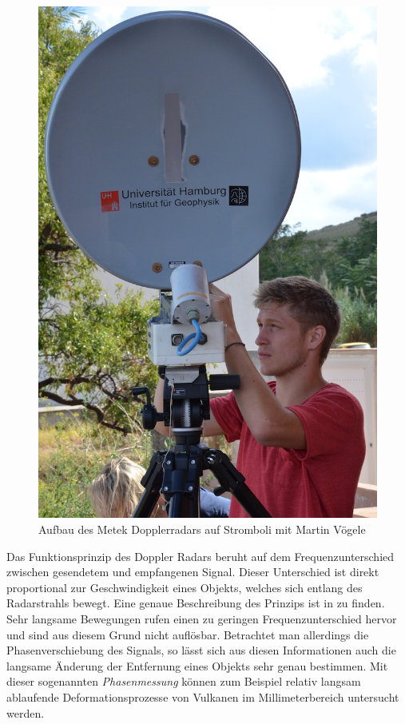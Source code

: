 \documentclass[12pt,a4paper]{scrartcl}
\begin{document}
\begin{figure}[htb]
\centering
\includegraphics[scale=.3]{hardwareimages/radar.jpg}
\caption{Aufbau des Metek Dopplerradars auf Stromboli mit Martin Vögele}
\label{radar}
\end{figure}

Das Funktionsprinzip des Doppler Radars beruht auf dem Frequenzunterschied zwischen gesendetem und empfangenen Signal. Dieser Unterschied ist direkt proportional zur Geschwindigkeit eines Objekts, welches sich entlang des Radarstrahls bewegt. Eine genaue Beschreibung des Prinzips ist in \citep{Hort:2003fk} zu finden. \\

Sehr langsame Bewegungen rufen einen zu geringen Frequenzunterschied hervor und sind aus diesem Grund nicht auflösbar. Betrachtet man allerdings die Phasenverschiebung des Signals, so lässt sich aus diesen Informationen auch die langsame Änderung der Entfernung eines Objekts sehr genau bestimmen. 
Mit dieser sogenannten \textit{Phasenmessung} können zum Beispiel relativ langsam ablaufende Deformationsprozesse von Vulkanen im Millimeterbereich untersucht werden.
\end{document}
